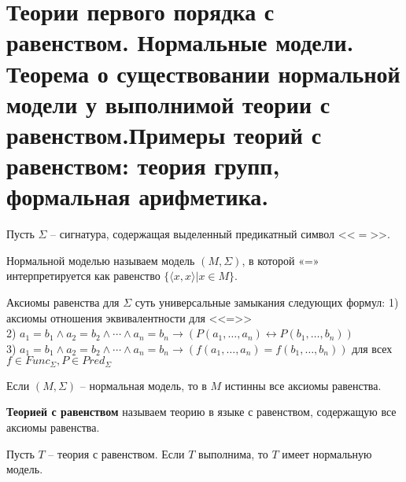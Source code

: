 \section{Теории первого порядка с равенством. Нормальные модели. Теорема о существовании нормальной модели у выполнимой теории с равенством.Примеры теорий с равенством: теория групп, формальная арифметика.}
Пусть $\Sigma$ -- сигнатура, содержащая выделенный предикатный символ <<$ = $>>.
\begin{definition}
    Нормальной моделью называем модель $(M,\Sigma)$, в которой «=» интерпретируется как равенство $\{\langle x,x \rangle |x\in M \}$.
\end{definition}
\begin{definition}
    Аксиомы равенства для $\Sigma$ суть универсальные замыкания следующих формул:
    1) аксиомы отношения эквивалентности для <<=>>\\
    2) $a_{1}=b_{1} \wedge a_{2}=b_{2} \wedge \cdots \wedge a_{n}=b_{n} \rightarrow\left(P\left(a_{1}, \ldots, a_{n}\right) \leftrightarrow P\left(b_{1}, \ldots, b_{n}\right)\right)$\\
    3) $a_{1}=b_{1} \wedge a_{2}=b_{2} \wedge \cdots \wedge a_{n}=b_{n} \rightarrow\left(f\left(a_{1}, \ldots, a_{n}\right)=f\left(b_{1}, \ldots, b_{n}\right)\right)$ для всех $f\in Func_\Sigma,P\in Pred_\Sigma$
\end{definition}
\begin{proposition}
    Если $(M,\Sigma)$ -- нормальная модель, то в $M$ истинны все аксиомы равенства.
\end{proposition}
\begin{definition}
    \textbf{Теорией с равенством} называем теорию в языке с равенством, содержащую все аксиомы равенства.
\end{definition}
\begin{theorem}
    Пусть $T$ -- теория с равенством. Если $T$ выполнима, то $T$ имеет нормальную модель.
\end{theorem}
